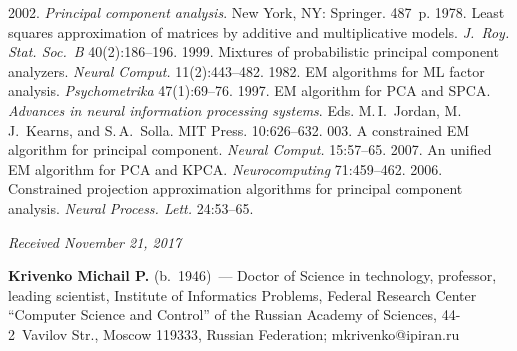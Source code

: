 






  \begin{multicols}{2}

\renewcommand{\bibname}{\protect\rmfamily References}

{\small\frenchspacing
 {%
 \begin{thebibliography}{9} 
 2002. \textit{Principal component analysis}. 
New York, NY: Springer. 487~p.
 1978. Least squares approximation of matrices by additive and 
multiplicative models. \textit{J.~Roy. Stat. Soc.~B} 40(2):186--196.
 1999. Mixtures of probabilistic principal 
component analyzers. \textit{Neural Comput.} 11(2):443--482.
 1982. EM algorithms for ML factor 
analysis. \textit{Psychometrika} 47(1):69--76.
 1997. EM algorithm for PCA and SPCA. \textit{Advances in neural 
information processing systems}.
Eds. M.\,I.~Jordan, M.\,J.~Kearns, and
S.\,A.~Solla. MIT Press. 10:626--632.
 003. A constrained EM algorithm for principal 
component. \textit{Neural Comput.} 15:57--65.
 2007. An unified EM algorithm for PCA and KPCA. 
\textit{Neurocomputing} 71:459--462.
 2006. Constrained projection 
approximation algorithms for principal component analysis. \textit{Neural Process. 
Lett.} 24:53--65.
\end{thebibliography}

 }
 }

\end{multicols}

\vspace*{-6pt}

\hfill{\small\textit{Received November 21, 2017}}


\Contrl

\noindent
\textbf{Krivenko Michail P.} (b.\ 1946)~--- Doctor of Science in technology, 
professor, leading scientist, Institute of Informatics Problems, Federal Research 
Center ``Computer Science and Control'' of the Russian Academy of Sciences,  
44-2~Vavilov Str., Moscow 119333, Russian Federation; 
\mbox{mkrivenko@ipiran.ru}

\label{end\stat}


\renewcommand{\bibname}{\protect\rm Литература} 